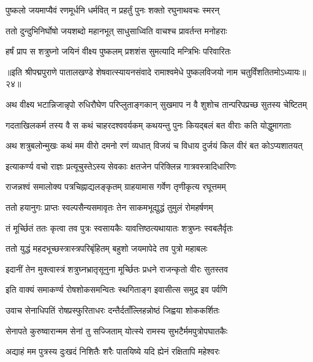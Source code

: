 \twolineshloka
{पुष्कलो जयमाप्यैवं रणमूर्धनि धर्मवित्}
{न प्रहर्तुं पुनः शक्तो रघुनाथवचः स्मरन्}%

\twolineshloka
{ततो दुन्दुभिनिर्घोषो जयशब्दो महानभूत्}
{साधुसाध्विति वाचश्च प्रावर्तन्त मनोहराः}%

\twolineshloka
{हर्षं प्राप स शत्रुघ्नो जयिनं वीक्ष्य पुष्कलम्}
{प्रशशंस सुमत्यादि मन्त्रिभिः परिवारितः}%

{॥इति श्रीपद्मपुराणे पातालखण्डे शेषवात्स्यायनसंवादे रामाश्वमेधे पुष्कलविजयो नाम चतुर्विंशतितमोऽध्यायः॥२४॥}



\twolineshloka
{अथ वीक्ष्य भटान्निजान्नृपो रुधिरौघेण परिप्लुताङ्गकान्}
{सुखमाप न वै शुशोच तान्परिपप्रच्छ सुतस्य चेष्टितम्}%

\twolineshloka
{गदताखिलकर्म तस्य वै स कथं चाहरदश्ववर्यकम्}
{कथयन्तु पुनः कियद्बलं बत वीराः कति योद्धुमागताः}%

\twolineshloka
{अथ शत्रुबलोन्मुखः कथं मम वीरो दमनो रणं व्यधात्}
{विजयं च विधाय दुर्जयं किल वीरं बत कोऽप्यशातयत्}%

\twolineshloka
{इत्याकर्ण्य वचो राज्ञः प्रत्यूचुस्तेऽस्य सेवकाः}
{क्षतजेन परिक्लिन्न गात्रवस्त्रादिधारिणः}%

\twolineshloka
{राजन्नश्वं समालोक्य पत्रचिह्नाद्यलङ्कृतम्}
{ग्राहयामास गर्वेण तृणीकृत्य रघूत्तमम्}%

\twolineshloka
{ततो हयानुगः प्राप्तः स्वल्पसैन्यसमावृतः}
{तेन साकमभूद्युद्धं तुमुलं रोमहर्षणम्}%

\twolineshloka
{तं मूर्च्छितं ततः कृत्वा तव पुत्रः स्वसायकैः}
{यावत्तिष्ठत्यथायातः शत्रुघ्नः स्वबलैर्वृतः}%

\twolineshloka
{ततो युद्धं महदभूच्छस्त्रास्त्रपरिबृंहितम्}
{बहुशो जयमापेदे तव पुत्रो महाबलः}%

\twolineshloka
{इदानीं तेन मुक्त्वास्त्रं शत्रुघ्नभ्रातृसूनुना}
{मूर्च्छितः प्रधने राजन्कृतो वीरः सुतस्तव}%

\twolineshloka
{इति वाक्यं समाकर्ण्य रोषशोकसमन्वितः}
{स्थगिताङ्ग इवासीत्स समुद्र इव पर्वणि}%

\twolineshloka
{उवाच सेनाधिपतिं रोषप्रस्फुरिताधरः}
{दन्तैर्दताँल्लिहन्नोष्ठं जिह्वया शोककर्शितः}%

\twolineshloka
{सेनापते कुरुष्वारान्मम सेनां तु सज्जिताम्}
{योत्स्ये रामस्य सुभटैर्ममपुत्रोपघातकैः}%

\twolineshloka
{अद्याहं मम पुत्रस्य दुःखदं निशितैः शरैः}
{पातयिष्ये यदि ह्येनं रक्षितापि महेश्वरः}%

